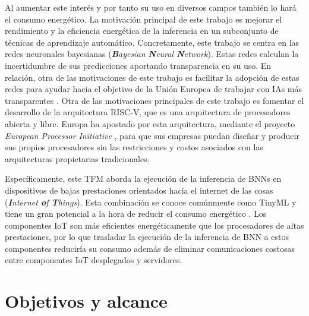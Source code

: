 Al aumentar este interés y por tanto su uso en diversos campos también lo hará el consumo energético. La motivación principal de este trabajo es mejorar el rendimiento y la eficiencia energética de la inferencia en un subconjunto de técnicas de aprendizaje automático. Concretamente, este trabajo se centra en las redes neuronales bayesianas (\textit{\textbf{B}ayesian \textbf{N}eural \textbf{N}etwork}). Estas redes calculan la incertidumbre de sus predicciones aportando transparencia en su uso. En relación, otra de las motivaciones de este trabajo es facilitar la adopción de estas redes para ayudar hacia el objetivo de la Unión Europea de trabajar con IAs más transparentes \cite{eu_ai}. Otra de las motivaciones principales de este trabajo es fomentar el desarrollo de la arquitectura RISC-V, que es una arquitectura de procesadores abierta y libre. Europa ha apostado por esta arquitectura, mediante el proyecto \textit{European Processor Initiative} \cite{european_processor}, para que sus empresas puedan diseñar y producir sus propios procesadores sin las restricciones y costos asociados con las arquitecturas propietarias tradicionales. 

Específicamente, este TFM aborda la ejecución de la inferencia de BNNs en dispositivos de bajas prestaciones orientados hacia el internet de las cosas (\textit{\textbf{I}nternet \textbf{o}f \textbf{T}hings}). Esta combinación se conoce comúnmente como TinyML y tiene un gran potencial a la hora de reducir el consumo energético \cite{tinyML_sustainable}. Los componentes IoT son más eficientes energéticamente que los procesadores de altas prestaciones, por lo que trasladar la ejecución de la inferencia de BNN a estos componentes reduciría su consumo además de eliminar comunicaciones costosas entre componentes IoT desplegados y servidores.

\section{Objetivos y alcance}

